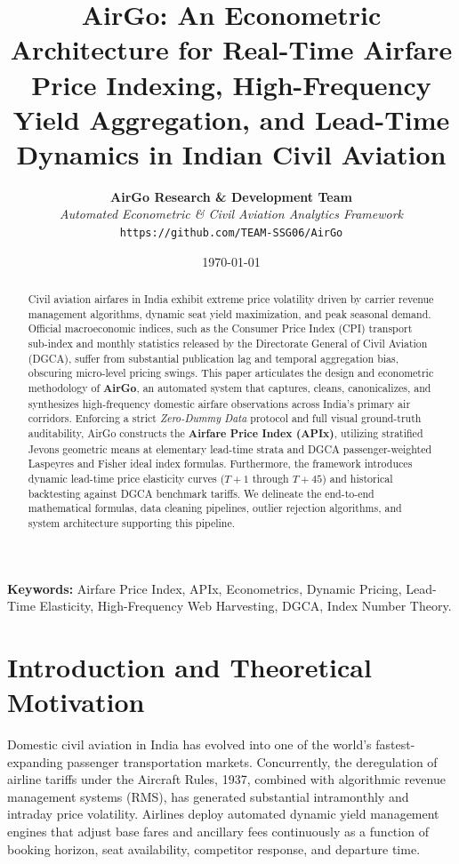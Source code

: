 \documentclass[11pt,a4paper]{article}
\title{\textbf{\LARGE AirGo: An Econometric Architecture for Real-Time Airfare Price Indexing, High-Frequency Yield Aggregation, and Lead-Time Dynamics in Indian Civil Aviation}}
\author{
    \textbf{AirGo Research \& Development Team} \\
    \textit{Automated Econometric \& Civil Aviation Analytics Framework} \\
    \texttt{https://github.com/TEAM-SSG06/AirGo}
}
\date{\today}
\begin{document}
\maketitle

\begin{abstract}
Civil aviation airfares in India exhibit extreme price volatility driven by carrier revenue management algorithms, dynamic seat yield maximization, and peak seasonal demand. Official macroeconomic indices, such as the Consumer Price Index (CPI) transport sub-index and monthly statistics released by the Directorate General of Civil Aviation (DGCA), suffer from substantial publication lag and temporal aggregation bias, obscuring micro-level pricing swings. This paper articulates the design and econometric methodology of \textbf{AirGo}, an automated system that captures, cleans, canonicalizes, and synthesizes high-frequency domestic airfare observations across India's primary air corridors. Enforcing a strict \textit{Zero-Dummy Data} protocol and full visual ground-truth auditability, AirGo constructs the \textbf{Airfare Price Index (APIx)}, utilizing stratified Jevons geometric means at elementary lead-time strata and DGCA passenger-weighted Laspeyres and Fisher ideal index formulas. Furthermore, the framework introduces dynamic lead-time price elasticity curves ($T+1$ through $T+45$) and historical backtesting against DGCA benchmark tariffs. We delineate the end-to-end mathematical formulas, data cleaning pipelines, outlier rejection algorithms, and system architecture supporting this pipeline.
\end{abstract}

\vspace{0.5em}
\noindent\textbf{Keywords:} Airfare Price Index, APIx, Econometrics, Dynamic Pricing, Lead-Time Elasticity, High-Frequency Web Harvesting, DGCA, Index Number Theory.

\newpage
\tableofcontents
\newpage

\section{Introduction and Theoretical Motivation}
\label{sec:intro}

Domestic civil aviation in India has evolved into one of the world's fastest-expanding passenger transportation markets. Concurrently, the deregulation of airline tariffs under the Aircraft Rules, 1937, combined with algorithmic revenue management systems (RMS), has generated substantial intramonthly and intraday price volatility. Airlines deploy automated dynamic yield management engines that adjust base fares and ancillary fees continuously as a function of booking horizon, seat availability, competitor response, and departure time.
\end{document}
